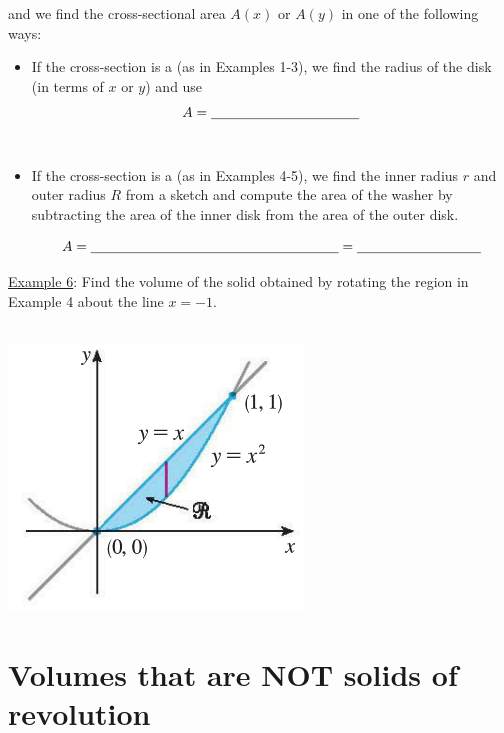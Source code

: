 \documentclass[paper=a4, fontsize=11pt]{scrartcl} %
\numberwithin{equation}{section} %
\numberwithin{figure}{section} %
\numberwithin{table}{section} %
\begin{document}
 and we find the cross-sectional area $A(x)$ or $A(y)$ in one of the following ways:
 
 \begin{itemize}
 \item If the cross-section is a \underline{\hspace{0.75in}} (as in Examples 1-3), we find the radius of the disk (in terms of $x$ or $y$) and use
 \[A = \underline{\hspace{1.5in}}\]\\
 \item If the cross-section is a \underline{\hspace{1in}} (as in Examples 4-5), we find the inner radius $r$ and outer radius $R$ from a sketch and compute the area of the washer by subtracting the area of the inner disk from the area of the outer disk.
 
 \[A = \underline{\hspace{2.5in}} = \underline{\hspace{1.25in}}\]
 \end{itemize}

 \underline{Example 6}: Find the volume of the solid obtained by rotating the region in Example 4 about the line $x=-1$.\\
 \indent\\
 \indent
 
 
 
 \hspace{1in} \includegraphics[scale=0.4]{6-2pic8.png}
 
 \vspace{2.5in}
 
 \newpage
 
 \section*{Volumes that are NOT solids of revolution}
 
\end{document}
